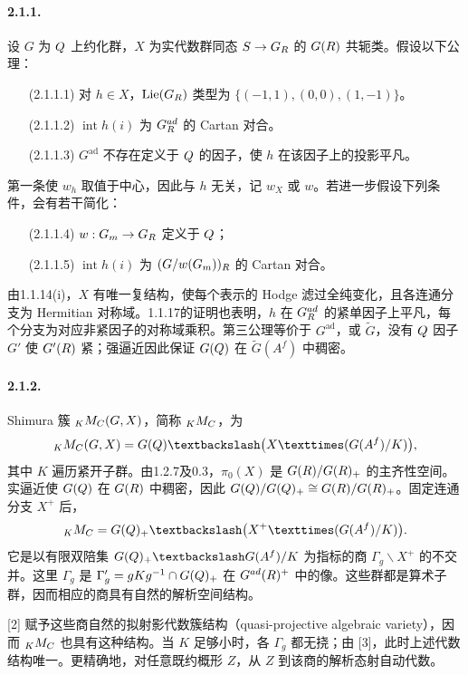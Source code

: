 \paragraph*{2.1.1.} 设 $G$ 为 $Q$ 上约化群，$X$ 为实代数群同态 $S\to G_{R}$ 的 $G(R)$ 共轭类。假设以下公理：
\begin{enumerate}
\item[(2.1.1.1)] 对 $h\in X$，$\operatorname{Lie}(G_{R})$ 类型为 $\{(-1,1),(0,0),(1,-1)\}$。
\item[(2.1.1.2)] $\operatorname{int}h(i)$ 为 $G_{R}^{ad}$ 的 Cartan 对合。
\item[(2.1.1.3)] $G^{\mathrm{ad}}$ 不存在定义于 $Q$ 的因子，使 $h$ 在该因子上的投影平凡。
\end{enumerate}
第一条使 $w_h$ 取值于中心，因此与 $h$ 无关，记 $w_X$ 或 $w$。若进一步假设下列条件，会有若干简化：
\begin{enumerate}
\item[(2.1.1.4)] $w:G_{m}\to G_{R}$ 定义于 $Q$；
\item[(2.1.1.5)] $\operatorname{int}h(i)$ 为 $(G/w(G_{m}))_{R}$ 的 Cartan 对合。
\end{enumerate}
由1.1.14(i)，$X$ 有唯一复结构，使每个表示的 Hodge 滤过全纯变化，且各连通分支为 Hermitian 对称域。1.1.17的证明也表明，$h$ 在 $G_{R}^{ad}$ 的紧单因子上平凡，每个分支为对应非紧因子的对称域乘积。第三公理等价于 $G^{\mathrm{ad}}$，或 $\widetilde G$，没有 $Q$ 因子 $G'$ 使 $G'(R)$ 紧；强逼近因此保证 $G(Q)$ 在 $\widetilde G(A^f)$ 中稠密。
\paragraph*{2.1.2.} Shimura 簇 ${}_KM_{C}(G,X)$，简称 ${}_KM_{C}$，为
\[
 {}_KM_{\C}(G,X)=G(\Q)\backslash\bigl(X\times(G(A^f)/K)\bigr),
\]
其中 $K$ 遍历紧开子群。由1.2.7及0.3，$\pi_0(X)$ 是 $G(R)/G(R)_+$ 的主齐性空间。实逼近使 $G(Q)$ 在 $G(R)$ 中稠密，因此 $G(Q)/G(Q)_+\cong G(R)/G(R)_+$。固定连通分支 $X^+$ 后，
\[
 {}_KM_{\C}=G(\Q)_+\backslash\bigl(X^+\times(G(A^f)/K)\bigr).
\]
它是以有限双陪集 $G(\Q)_+\backslash G(A^f)/K$ 为指标的商 $\Gamma_g\backslash X^+$ 的不交并。这里 $\Gamma_g$ 是 $\Gamma'_g=gKg^{-1}\cap G(Q)_+$ 在 $G^{ad}(R)^+$ 中的像。这些群都是算术子群，因而相应的商具有自然的解析空间结构。

[2] 赋予这些商自然的拟射影代数簇结构（quasi-projective algebraic variety），因而 ${}_KM_{C}$ 也具有这种结构。当 $K$ 足够小时，各 $\Gamma_g$ 都无挠；由 [3]，此时上述代数结构唯一。更精确地，对任意既约概形 $Z$，从 $Z$ 到该商的解析态射自动代数。
